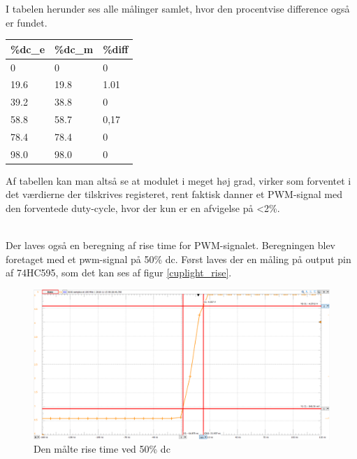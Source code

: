 \documentclass[Modultest/Modultest_main.tex]{subfiles}
\begin{document}
I tabelen herunder ses alle målinger samlet, hvor den procentvise difference også er fundet.

\begin{table}[H]
\centering
\begin{tabular}{|l|l|l|}
\hline
\textbf{\%dc\_e} & \textbf{\%dc\_m} & \textbf{\%diff} \\ \hline
0                & 0                & 0               \\ \hline
19.6             & 19.8             & 1.01            \\ \hline
39.2             & 38.8             & 0               \\ \hline
58.8             & 58.7             & 0,17            \\ \hline
78.4             & 78.4             & 0               \\ \hline
98.0             & 98.0             & 0               \\ \hline
\end{tabular}%
\end{table}

Af tabellen kan man altså se at modulet i meget høj grad, virker som forventet i det værdierne der tilskrives registeret, rent faktisk danner et PWM-signal med den forventede duty-cycle, hvor der kun er en afvigelse på <2\%. 

\\Der laves også en beregning af rise time for PWM-signalet.  Beregningen blev foretaget med et pwm-signal på 50\% dc.  Først laves der en måling på output pin af 74HC595, som det kan ses af figur \ref{cuplight_rise}.

\begin{figure}[H]
    \centering
    \includegraphics[width=\textwidth]{Modultest/CupLight/graphics/CupLight_rise_time.png}
    \caption{Den målte rise time ved 50\% dc}
    \label{fig:cuplight_rise}
\end{figure}
\end{document}
